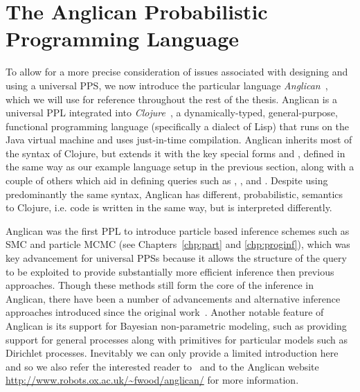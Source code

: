 
\section{The Anglican Probabilistic Programming Language}
\label{sec:probprog:anglican}


To allow for a more precise consideration of issues associated with designing and using a universal
PPS, we now introduce the particular language \emph{Anglican}~\citep{wood2014new,tolpin2016design},
which we will use for reference throughout the rest of the thesis.  
Anglican is a universal PPL integrated into \emph{Clojure}~\citep{hickey2008clojure}, a dynamically-typed, general-purpose, functional
programming language (specifically a dialect of Lisp) that runs on the Java virtual machine and uses just-in-time compilation.
Anglican inherits most of the syntax of Clojure, but extends it with the key
special forms \sample and \observe \citep{tolpin2015probabilistic,tolpin2016design}, defined in the same way as
our example language setup in the previous section, along with a couple of others which aid in defining queries
such as \mem, \store, and \retrieve.  Despite using predominantly the same syntax, Anglican has different, 
probabilistic, semantics to Clojure, i.e. code is written in the same way, but is interpreted differently.

Anglican was the first PPL to introduce particle based 
inference schemes such as SMC and particle MCMC (see Chapters~\ref{chp:part} and \ref{chp:proginf}), which was
key advancement for universal PPSs because it allows the structure of the query to be exploited to provide
substantially more efficient inference then previous approaches.  Though these methods still form the core
of the inference in Anglican, there have been a number of advancements and alternative inference approaches introduced since
the original work~\citep{paige2014asynchronous,tolpin-socs-2015,tolpin2015output,vandemeent_aistats_2015,
	rainforth2016interacting,rainforth2016bayesian,le2017inference}.  Another notable feature of Anglican is its
support for Bayesian non-parametric modeling, such as providing support for general processes along with
primitives for particular models such as Dirichlet processes.  Inevitably we can only provide a limited 
introduction here and so we also refer the interested reader to~\cite{tolpin2016design} and to the Anglican website {\small\url{http://www.robots.ox.ac.uk/~fwood/anglican/}} for more information.

